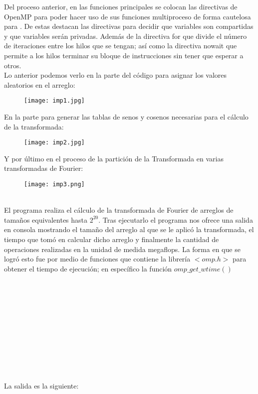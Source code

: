 \documentclass{article}
\begin{document}
Del proceso anterior, en las funciones principales se colocan las directivas de OpenMP para poder hacer uso de sus funciones multiproceso de forma cautelosa para . De estas destacan las directivas para decidir que variables son compartidas y que variables serán privadas. Además de la directiva for que divide el número de iteraciones entre los hilos que se tengan; así como la directiva nowait que permite a los hilos terminar su bloque de instrucciones sin tener que esperar a otros.\\

Lo anterior podemos verlo en la parte del código para asignar los valores aleatorios en el arreglo:


\begin{figure}[h]
\centering
\texttt{[image: imp1.jpg]}
\end{figure}
\vspace{5cm}
En la parte para generar las tablas de senos y cosenos necesarias para el cálculo de la transformada:\\
\begin{figure}[h]
\centering
\texttt{[image: imp2.jpg]}
\end{figure}

Y por último en el proceso de la partición de la Transformada en varias transformadas de Fourier:\\
\begin{figure}[h]
\centering
\texttt{[image: imp3.png]}
\end{figure}\\

El programa realiza el cálculo de la transformada de Fourier de arreglos de tamaños equivalentes hasta $2^{20}$. Tras ejecutarlo el programa nos ofrece una salida en consola mostrando el tamaño del arreglo al que se le aplicó la transformada, el tiempo que tomó en calcular dicho arreglo y finalmente la cantidad de operaciones realizadas en la unidad de medida megaflops. La forma en que se logró esto fue por medio de funciones que contiene la librería $<omp.h>$ para obtener el tiempo de ejecución; en específico la función $omp\_get\_wtime()$\\ \\
\\ \\
\\ \\
\\ \\
\\ \\
\\ \\
La salida es la siguiente:
\end{document}
